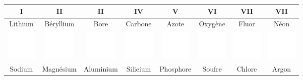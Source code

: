 \documentclass[
  11pt,
  french,
  a4paper,
  openany]{book}
\begin{document}
\begin{longtable}[]{@{}cccccccc@{}}
\toprule
I & II & II & IV & V & VI & VII & VII\tabularnewline
\midrule
\endhead
Lithium & Béryllium & Bore & Carbone & Azote & Oxygène & Fluor & Néon\tabularnewline
\includegraphics[width=\textwidth,height=4em]{images/1px.png} & \includegraphics[width=\textwidth,height=4em]{images/1px.png} & \includegraphics[width=\textwidth,height=4em]{images/1px.png} & \includegraphics[width=\textwidth,height=4em]{images/1px.png} & \includegraphics[width=\textwidth,height=4em]{images/1px.png} & \includegraphics[width=\textwidth,height=4em]{images/1px.png} & \includegraphics[width=\textwidth,height=4em]{images/1px.png} & \includegraphics[width=\textwidth,height=4em]{images/1px.png}\tabularnewline
Sodium & Magnésium & Aluminium & Silicium & Phosphore & Soufre & Chlore & Argon\tabularnewline

\end{longtable}
\end{document}
